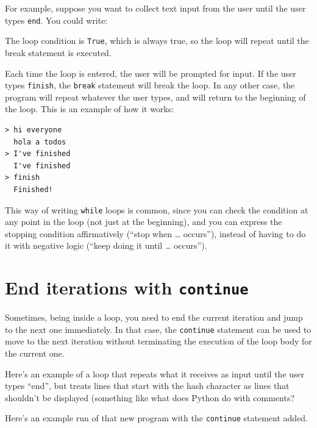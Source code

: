 For example, suppose you want to collect text input from the user until the user types \texttt{end}. You could write:


The loop condition is \texttt{True}, which is always true, so the loop will repeat until the break statement is executed.

Each time the loop is entered, the user will be prompted for input. If the user types \texttt{finish}, the \texttt{break} statement will break the loop. In any other case, the program will repeat whatever the user types, and will return to the beginning of the loop. This is an example of how it works:

\begin{Verbatim}[frame=single]
> hi everyone
  hola a todos
> I've finished
  I've finished
> finish
  Finished!
\end{Verbatim}

This way of writing \texttt{while} loops is common, since you can check the condition at any point in the loop (not just at the beginning), and you can express the stopping condition affirmatively (``stop when \ldots{} occurs''), instead of having to do it with negative logic (``keep doing it until \ldots{} occurs'').

\hypertarget{finalizar-iteraciones-con-continue}{%
\section{\texorpdfstring{End iterations with \texttt{continue}}{Finalizar iteraciones con continue}}\label{finalizar-iteraciones-con-continue}}

 

Sometimes, being inside a loop, you need to end the current iteration and jump to the next one immediately. In that case, the \texttt{continue} statement can be used to move to the next iteration without terminating the execution of the loop body for the current one.

Here's an example of a loop that repeats what it receives as input until the user types ``end'', but treats lines that start with the hash character as lines that shouldn't be displayed (something like what does Python do with comments?


Here's an example run of that new program with the \texttt{continue} statement added.

